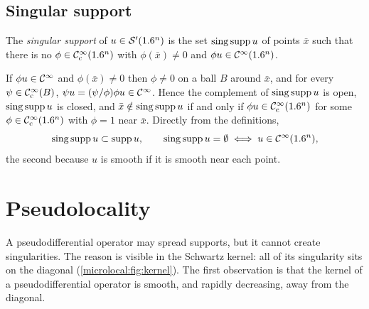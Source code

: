 \subsection{Singular support}

\begin{definition}\label{microlocal:def:singsupp}
  The \emph{singular support} of $u\in\mathcal{S}'(1.6^n)$ is the set $\operatorname{sing\,supp} u$
  of points $\bar x$ such that there is no $\phi\in\mathcal{C}^\infty_{\mathrm{c}}(1.6^n)$ with
  $\phi(\bar x)\ne0$ and $\phi u\in\mathcal{C}^\infty(1.6^n)$.
\end{definition}

If $\phi u\in\mathcal{C}^\infty$ and $\phi(\bar x)\ne0$ then $\phi\ne0$ on a ball $B$
around $\bar x$, and for every $\psi\in\mathcal{C}^\infty_{\mathrm{c}}(B)$,
$\psi u=(\psi/\phi)\phi u\in\mathcal{C}^\infty$. Hence the complement of $\operatorname{sing\,supp} u$ is
open, $\operatorname{sing\,supp} u$ is closed, and $\bar x\notin\operatorname{sing\,supp} u$ if and only if
$\phi u\in\mathcal{C}^\infty_{\mathrm{c}}(1.6^n)$ for some $\phi\in\mathcal{C}^\infty_{\mathrm{c}}(1.6^n)$ with $\phi=1$ near $\bar
x$. Directly from the definitions,
\begin{equation*}
  \operatorname{sing\,supp} u\subset\operatorname{supp} u,\qquad
  \operatorname{sing\,supp} u=\emptyset\iff u\in\mathcal{C}^\infty(1.6^n),
\end{equation*}
the second because $u$ is smooth if it is smooth near each point.

\section{Pseudolocality}\label{microlocal:sec:pseudolocal}

A pseudodifferential operator may spread supports, but it cannot create
singularities. The reason is visible in the Schwartz kernel: all of its
singularity sits on the diagonal (\cref{microlocal:fig:kernel}). The first
observation is that the kernel of a pseudodifferential operator is
smooth, and rapidly decreasing, away from the diagonal.

